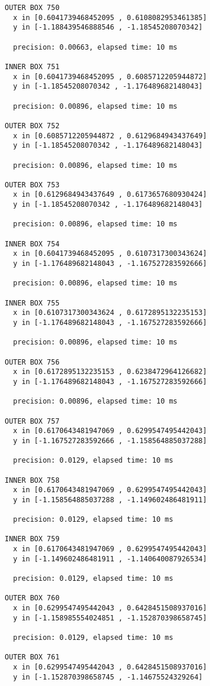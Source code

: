 \begin{verbatim}
OUTER BOX 750
  x in [0.6041739468452095 , 0.6108082953461385]
  y in [-1.188439546888546 , -1.18545208070342]

  precision: 0.00663, elapsed time: 10 ms

INNER BOX 751
  x in [0.6041739468452095 , 0.6085712205944872]
  y in [-1.18545208070342 , -1.176489682148043]

  precision: 0.00896, elapsed time: 10 ms

OUTER BOX 752
  x in [0.6085712205944872 , 0.6129684943437649]
  y in [-1.18545208070342 , -1.176489682148043]

  precision: 0.00896, elapsed time: 10 ms

OUTER BOX 753
  x in [0.6129684943437649 , 0.6173657680930424]
  y in [-1.18545208070342 , -1.176489682148043]

  precision: 0.00896, elapsed time: 10 ms

INNER BOX 754
  x in [0.6041739468452095 , 0.6107317300343624]
  y in [-1.176489682148043 , -1.167527283592666]

  precision: 0.00896, elapsed time: 10 ms

INNER BOX 755
  x in [0.6107317300343624 , 0.6172895132235153]
  y in [-1.176489682148043 , -1.167527283592666]

  precision: 0.00896, elapsed time: 10 ms

OUTER BOX 756
  x in [0.6172895132235153 , 0.6238472964126682]
  y in [-1.176489682148043 , -1.167527283592666]

  precision: 0.00896, elapsed time: 10 ms

OUTER BOX 757
  x in [0.6170643481947069 , 0.6299547495442043]
  y in [-1.167527283592666 , -1.158564885037288]

  precision: 0.0129, elapsed time: 10 ms

INNER BOX 758
  x in [0.6170643481947069 , 0.6299547495442043]
  y in [-1.158564885037288 , -1.149602486481911]

  precision: 0.0129, elapsed time: 10 ms

INNER BOX 759
  x in [0.6170643481947069 , 0.6299547495442043]
  y in [-1.149602486481911 , -1.140640087926534]

  precision: 0.0129, elapsed time: 10 ms

OUTER BOX 760
  x in [0.6299547495442043 , 0.6428451508937016]
  y in [-1.158985554024851 , -1.152870398658745]

  precision: 0.0129, elapsed time: 10 ms

OUTER BOX 761
  x in [0.6299547495442043 , 0.6428451508937016]
  y in [-1.152870398658745 , -1.14675524329264]


\end{verbatim}
